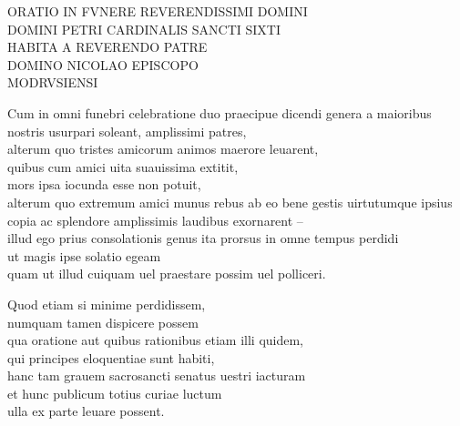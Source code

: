 \documentclass[a5paper,twoside]{article}
\begin{document}
\frenchspacing

\fontsize{11}{13.2}
\selectfont

\linespread{1.1}

\thispagestyle{empty}


\beginnumbering
\autopar


\pstart

{\centering

\noindent ORATIO IN FVNERE REVERENDISSIMI DOMINI \\
DOMINI PETRI CARDINALIS SANCTI SIXTI \\
HABITA A REVERENDO PATRE \\
DOMINO NICOLAO 
EPISCOPO \\
MODRVSIENSI

}

\pend


\bigskip

\numberpstarttrue

\setcounter{pstart}{1}


Cum in omni funebri celebratione duo praecipue dicendi genera a maioribus nostris usurpari soleant, amplissimi patres, \\
alterum quo tristes amicorum animos maerore leuarent, \\
quibus cum amici uita suauissima extitit, \\
mors ipsa iocunda esse non potuit, \\
alterum quo extremum amici munus rebus ab eo bene gestis uirtutumque ipsius copia ac splendore amplissimis laudibus exornarent – \\
illud ego prius consolationis genus ita prorsus in omne tempus perdidi \\
ut magis ipse solatio egeam \\
quam ut illud cuiquam uel praestare possim uel polliceri. 

Quod etiam si minime perdidissem, \\
numquam tamen dispicere possem \\
qua oratione aut quibus rationibus etiam illi quidem, \\
qui principes eloquentiae sunt habiti, \\
hanc tam grauem sacrosancti senatus uestri iacturam \\
et hunc publicum totius curiae luctum \\
ulla ex parte leuare possent. 
\end{document}
